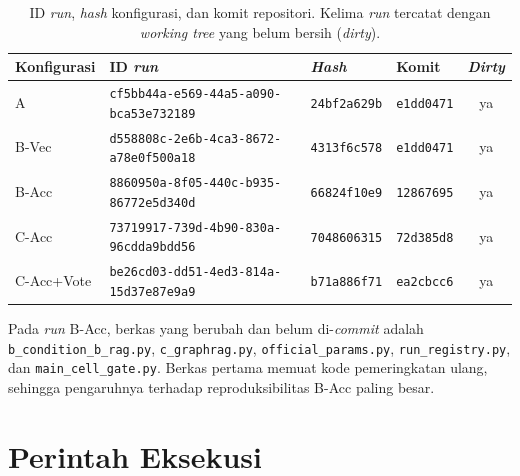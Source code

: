 \begin{table}[!htbp]
\centering
\scriptsize
\caption{ID \emph{run}, \emph{hash} konfigurasi, dan komit repositori. Kelima \emph{run} tercatat dengan \emph{working tree} yang belum bersih (\emph{dirty}).}
\label{tab:lamp-run}
\renewcommand{\arraystretch}{1.3}
\begin{tabularx}{\textwidth}{|l|>{\raggedright\arraybackslash}X|l|l|c|}
\hline
\textbf{Konfigurasi} & \textbf{ID \emph{run}} & \textbf{\emph{Hash}} & \textbf{Komit} & \textbf{\emph{Dirty}} \\
\hline
A & \texttt{cf5bb44a-\allowbreak{}e569-\allowbreak{}44a5-\allowbreak{}a090-\allowbreak{}bca53e732189} & \texttt{24bf2a629b} & \texttt{e1dd0471} & ya \\
\hline
B-Vec & \texttt{d558808c-\allowbreak{}2e6b-\allowbreak{}4ca3-\allowbreak{}8672-\allowbreak{}a78e0f500a18} & \texttt{4313f6c578} & \texttt{e1dd0471} & ya \\
\hline
B-Acc & \texttt{8860950a-\allowbreak{}8f05-\allowbreak{}440c-\allowbreak{}b935-\allowbreak{}86772e5d340d} & \texttt{66824f10e9} & \texttt{12867695} & ya \\
\hline
C-Acc & \texttt{73719917-\allowbreak{}739d-\allowbreak{}4b90-\allowbreak{}830a-\allowbreak{}96cdda9bdd56} & \texttt{7048606315} & \texttt{72d385d8} & ya \\
\hline
C-Acc+Vote & \texttt{be26cd03-\allowbreak{}dd51-\allowbreak{}4ed3-\allowbreak{}814a-\allowbreak{}15d37e87e9a9} & \texttt{b71a886f71} & \texttt{ea2cbcc6} & ya \\
\hline
\end{tabularx}
\end{table}

Pada \emph{run} B-Acc, berkas yang berubah dan belum di-\emph{commit} adalah \texttt{b\_\allowbreak{}condition\_\allowbreak{}b\_\allowbreak{}rag.\allowbreak{}py}, \texttt{c\_\allowbreak{}graphrag.\allowbreak{}py}, \texttt{official\_\allowbreak{}params.\allowbreak{}py}, \texttt{run\_\allowbreak{}registry.\allowbreak{}py}, dan \texttt{main\_\allowbreak{}cell\_\allowbreak{}gate.\allowbreak{}py}. Berkas pertama memuat kode pemeringkatan ulang, sehingga pengaruhnya terhadap reproduksibilitas B-Acc paling besar.

\section{Perintah Eksekusi}
\label{sec:lamp-d-perintah}


